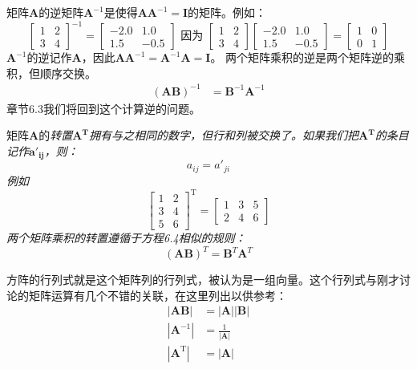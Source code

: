 \documentclass[lang=cn,12pt]{elegantbook}
\begin{document}
矩阵$\mathbf{A}$的逆矩阵$\mathbf{A}^{-1}$是使得$\mathbf{A}\mathbf{A}^{-1} = \mathbf{I}$的矩阵。例如：
$$
  \left[\begin{array}{ll}
      1 & 2 \\
      3 & 4
    \end{array}\right]^{-1}=\left[\begin{array}{rr}
      -2.0 & 1.0  \\
      1.5  & -0.5
    \end{array}\right] \text { 因为 }\left[\begin{array}{ll}
      1 & 2 \\
      3 & 4
    \end{array}\right]\left[\begin{array}{rr}
      -2.0 & 1.0  \\
      1.5  & -0.5
    \end{array}\right]=\left[\begin{array}{ll}
      1 & 0 \\
      0 & 1
    \end{array}\right]
$$
$\mathbf{A}^{-1}$的逆记作$\mathbf{A}$，因此$\mathbf{AA}^{-1} = \mathbf{A}^{-1}\mathbf{A} = \mathbf{I}$。
两个矩阵乘积的逆是两个矩阵逆的乘积，但顺序交换。
\begin{align}
  (\mathbf{A B})^{-1} & = \mathbf{B}^{-1} \mathbf{A}^{-1}
\end{align}
章节6.3我们将回到这个计算逆的问题。

矩阵$\mathbf{A}$的\it{转置}$\mathbf{A^T}$拥有与之相同的数字，但行和列被交换了。如果我们把$\mathbf{A^T}$的条目记作$\mathbf{a'_{ij}}$，则：$$a_{ij} = a'_{ji}$$例如
$$
  \left[\begin{array}{ll}
      1 & 2 \\
      3 & 4 \\
      5 & 6
    \end{array}\right]^{\mathrm{T}}=\left[\begin{array}{lll}
      1 & 3 & 5 \\
      2 & 4 & 6
    \end{array}\right]
$$
两个矩阵乘积的转置遵循于方程6.4相似的规则：$$(\mathbf{AB})^T=\mathbf{B}^T\mathbf{A}^T$$

方阵的行列式就是这个矩阵列的行列式，被认为是一组向量。这个行列式与刚才讨论的矩阵运算有几个不错的关联，在这里列出以供参考：
\begin{align}
  |\mathbf{A B}|                       & = |\mathbf{A}| |\mathbf{B}| \\
  \left|\mathbf{A}^{-1}\right|         & = \frac{1}{|\mathbf{A}|}    \\
  \left|\mathbf{A}^{\mathrm{T}}\right| & = |\mathbf{A}|
\end{align}
\end{document}
